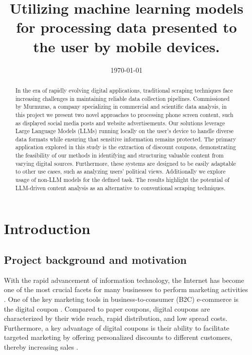 \documentclass[licencjacka,en]{pracamgr}
\title{Utilizing machine learning models for processing data presented to the user by mobile devices.}
\date{\today}
\begin{document}
\maketitle

\begin{abstract}
In the era of rapidly evolving digital applications, traditional scraping techniques face increasing challenges in maintaining reliable data collection pipelines. Commissioned by Murmuras, a company specializing in commercial and scientific data analysis, in this project we present two novel approaches to processing phone screen content, such as displayed social media posts and website advertisements. Our solutions leverage Large Language Models (LLMs) running locally on the user's device to handle diverse data formats while ensuring that sensitive information remains protected. The primary application explored in this study is the extraction of discount coupons, demonstrating the feasibility of our methods in identifying and structuring valuable content from varying digital sources. Furthermore, these systems are designed to be easily adaptable to other use cases, such as analyzing users' political views. Additionally we explore usage of non-LLM models for the defined task. The results highlight the potential of LLM-driven content analysis as an alternative to conventional scraping techniques.
\raggedright
\end{abstract}

\tableofcontents
\listoffigures
\listoftables

\chapter{Introduction}

\section{Project background and motivation}
With the rapid advancement of information technology, the Internet has become one of the most crucial facets for many businesses to perform marketing activities \cite{design_of_coupons}. One of the key marketing tools in business-to-consumer (B2C) e-commerce is the digital coupon \cite{targeted_reminders}. Compared to paper coupons, digital coupons are characterized by their wide reach, rapid distribution, and low spread costs. Furthermore, a key advantage of digital coupons is their ability to facilitate targeted marketing by offering personalized discounts to different customers, thereby increasing sales \cite{design_of_coupons}. 
\end{document}
